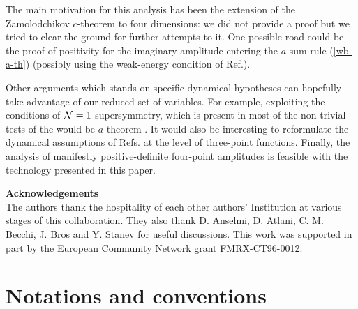 \documentclass[11pt]{article}
\begin{document}
The main motivation for this analysis has been the extension 
of the Zamolodchikov $c$-theorem to four dimensions:
we did not provide a proof but we tried to clear the ground
for further attempts to it. 
One possible road could be the proof of positivity 
for the imaginary amplitude entering the
$a$ sum rule (\ref{wb-a-th}) (possibly using the weak-energy condition
of Ref.\cite{ol}). 

Other arguments which stands on specific dynamical 
hypotheses can hopefully take advantage of our reduced set of variables.   
For example, exploiting the conditions of ${\cal N}=1$ supersymmetry,
which is present in most of the non-trivial tests of the would-be 
$a$-theorem \cite{afgj}\cite{fgpw}.
It would also be interesting to reformulate the dynamical
assumptions of Refs.\cite{ath} at the level of three-point functions. 
Finally, the analysis of manifestly positive-definite four-point amplitudes
is feasible with the technology presented in this paper.

\bigskip

{ \bf Acknowledgements}  \\
The authors thank the hospitality of each other authors' Institution
at various stages of this collaboration.
They also thank D. Anselmi, D. Atlani, C. M. Becchi, J. Bros 
and Y. Stanev for useful discussions.
This work was supported in part by the European Community  
Network grant FMRX-CT96-0012. 

 
 
\appendix 


 
\section{Notations and conventions} 
\label{app-conv}
\end{document}
